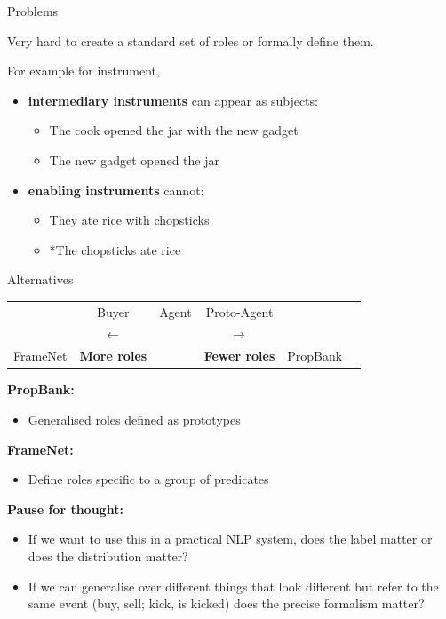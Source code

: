 \documentclass[10pt, compress]{beamer}
\begin{document}
\begin{frame}{Problems}

Very hard to create a standard set of roles or formally define them.

For example for {\sc instrument},
\begin{itemize}
\item \textbf{intermediary instruments} can appear as subjects:
  \begin{itemize}
     \item The cook opened the jar with the new gadget
     \item The new gadget opened the jar
  \end{itemize}
\item \textbf{enabling instruments} cannot:
  \begin{itemize}
    \item They ate rice with chopsticks
    \item *The chopsticks ate rice
  \end{itemize}
\end{itemize}
  
\end{frame}

\begin{frame}{Alternatives}

\begin{center}
\begin{tabular}{cccccc}
              & {\Large Buyer}        &  {\Large Agent} & {\Large Proto-Agent}      &   \\
              & $ {\Large \leftarrow}$ &                 & $ {\Large \rightarrow} $  &  \\
FrameNet      & \textbf{More roles} &                  &  \textbf{Fewer roles}   & PropBank
\end{tabular}
\end{center}

\textbf{PropBank:}
\begin{itemize}
  \item Generalised roles defined as prototypes
\end{itemize}

\textbf{FrameNet:}
\begin{itemize}
  \item Define roles specific to a group of predicates
\end{itemize}

\textbf{Pause for thought:}
\begin{itemize}
  \item If we want to use this in a practical NLP system, does the label matter
     or does the distribution matter? 
  \item If we can generalise over different things that look different but refer to
     the same event (buy, sell; kick, is kicked) does the precise formalism matter?
\end{itemize}

\end{frame}
\end{document}
